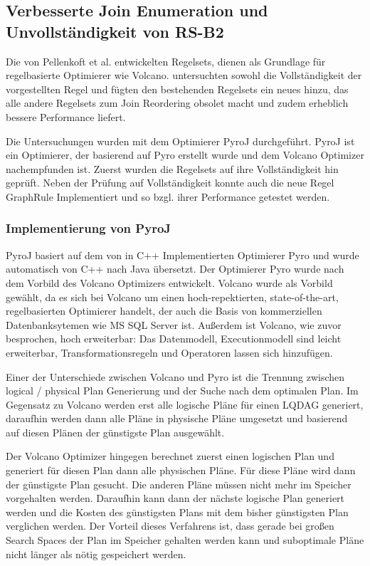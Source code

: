 \subsection{Verbesserte Join Enumeration und Unvollständigkeit von RS-B2}

Die von Pellenkoft et al. entwickelten Regelsets, dienen als Grundlage für regelbasierte Optimierer wie Volcano. \cite{shanbhag2014optimizing} untersuchten sowohl die Vollständigkeit der vorgestellten Regel und fügten den bestehenden Regelsets ein neues hinzu, das alle andere Regelsets zum Join Reordering obsolet macht und zudem erheblich bessere Performance liefert.

Die Untersuchungen \cite{shanbhag2014optimizing} wurden mit dem Optimierer PyroJ durchgeführt. PyroJ ist ein Optimierer, der basierend auf Pyro \cite{roy2001multi} erstellt wurde und dem Volcano Optimizer nachempfunden ist. Zuerst wurden die Regelsets auf ihre Vollständigkeit hin geprüft. Neben der Prüfung auf Vollständigkeit konnte auch die neue Regel GraphRule Implementiert und so bzgl. ihrer Performance getestet werden.



\subsubsection{Implementierung von PyroJ}

PyroJ basiert auf dem von \cite{roy2001multi} in C++ Implementierten Optimierer Pyro und wurde automatisch von C++ nach Java übersetzt. Der Optimierer Pyro wurde nach dem Vorbild des Volcano Optimizers entwickelt. Volcano wurde als Vorbild gewählt, da es sich bei Volcano um einen hoch-repektierten, state-of-the-art, regelbasierten Optimierer handelt, der auch die Basis von kommerziellen Datenbanksytemen wie MS SQL Server ist. Außerdem ist Volcano, wie zuvor besprochen, hoch erweiterbar: Das Datenmodell, Executionmodell sind leicht erweiterbar, Transformationsregeln und Operatoren lassen sich hinzufügen. 

Einer der Unterschiede zwischen Volcano und Pyro ist die Trennung zwischen logical / physical Plan Generierung und der Suche nach dem optimalen Plan. Im Gegensatz zu Volcano werden erst alle logische Pläne für einen LQDAG generiert, daraufhin werden dann alle Pläne in physische Pläne umgesetzt und basierend auf diesen Plänen der günstigste Plan ausgewählt.

Der Volcano Optimizer hingegen berechnet zuerst einen logischen Plan und generiert für diesen Plan dann alle physischen Pläne. Für diese Pläne wird dann der günstigste Plan gesucht. Die anderen Pläne müssen nicht mehr im Speicher vorgehalten werden. Daraufhin kann dann der nächste logische Plan generiert werden und die Kosten des günstigsten Plans mit dem bisher günstigsten Plan verglichen werden. Der Vorteil dieses Verfahrens ist, dass gerade bei großen Search Spaces der Plan im Speicher gehalten werden kann und suboptimale Pläne nicht länger als nötig gespeichert werden.

